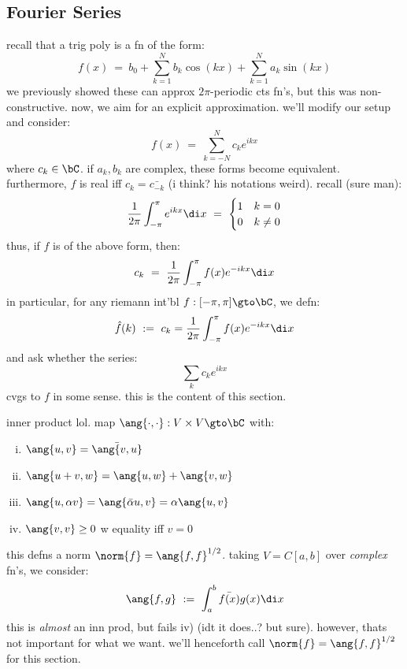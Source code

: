 \subsection{Fourier Series}

recall that a trig poly is a fn of the form:
\begin{equation*}
	f(x) \ = \ b_{0}+\sum_{k=1}^{N}b_{k}\cos(kx)+\sum_{k=1}^{N}a_{k}\sin(kx)
\end{equation*}
we previously showed these can approx $2\pi$-periodic cts fn's, but this was non-constructive.
now, we aim for an explicit approximation.
we'll modify our setup and consider:
\begin{equation*}
	f(x) \ = \ \sum_{k=-N}^{N}c_{k}e^{ikx}
\end{equation*}
where $c_{k}\in\bC$.
if $a_{k},b_{k}$ are complex, these forms become equivalent.
furthermore, $f$ is real iff $c_{k}=\bar{c_{-k}}$
(i think? his notations weird).
recall (sure man):
\begin{equation*}
	\frac{1}{2\pi}\int_{-\pi}^{\pi}e^{ikx}\di x \ = \
	\begin{cases}
		1 & k=0 \\ 0 & k\neq0
	\end{cases}
\end{equation*}
thus, if $f$ is of the above form, then:
\begin{equation*}
	c_{k} \ = \ \frac{1}{2\pi}\int_{-\pi}^{\pi}f(x)e^{-ikx}\di x
\end{equation*}
in particular, for any riemann int'bl $f:[-\pi,\pi]\gto\bC$, we defn:
\begin{equation*}
	\hat{f}(k) \ := \ c_{k} = \frac{1}{2\pi}\int_{-\pi}^{\pi}f(x)e^{-ikx}\di x
\end{equation*}
and ask whether the series:
\begin{equation*}
	\sum_{k}c_{k}e^{ikx}
\end{equation*}
cvgs to $f$ in some sense.
this is the content of this section.

\begin{defn}
	inner product lol. map $\ang{\cdot,\cdot}:V\times V\gto\bC$ with:
	\begin{enumerate}[i)]
		\item $\ang{u,v}=\bar{\ang{v,u}}$
		\item $\ang{u+v,w}=\ang{u,w}+\ang{v,w}$
		\item $\ang{u,\alpha v}=\ang{\bar{\alpha}u,v}=\alpha\ang{u,v}$
		\item $\ang{v,v}\geq0$ w equality iff $v=0$
	\end{enumerate}
\end{defn}
this defns a norm $\norm{f}=\ang{f,f}^{1/2}$.
taking $V=C[a,b]$ over \textit{complex} fn's, we consider:
\begin{equation*}
	\ang{f,g} \ := \ \int_{a}^{b}\bar{f(x)}g(x)\di x
\end{equation*}
this is \textit{almost} an inn prod, but fails iv) (idt it does..? but sure).
however, thats not important for what we want.
we'll henceforth call $\norm{f}=\ang{f,f}^{1/2}$ for this section.

